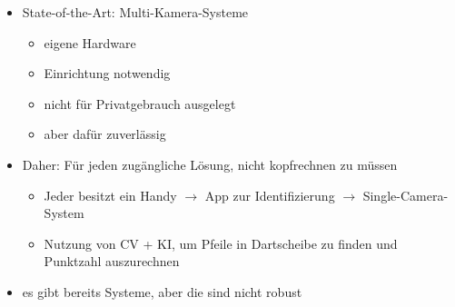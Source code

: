 \begin{itemize}
    \item State-of-the-Art: Multi-Kamera-Systeme
    \begin{itemize}
        \item eigene Hardware
        \item Einrichtung notwendig
        \item nicht für Privatgebrauch ausgelegt
        \item aber dafür zuverlässig
    \end{itemize}
    \item Daher: Für jeden zugängliche Lösung, nicht kopfrechnen zu müssen
    \begin{itemize}
        \item Jeder besitzt ein Handy $\rightarrow$ App zur Identifizierung $\rightarrow$ Single-Camera-System
        \item Nutzung von CV + KI, um Pfeile in Dartscheibe zu finden und Punktzahl auszurechnen
    \end{itemize}

    \item es gibt bereits Systeme, aber die sind nicht robust \cite{deepdarts, dartscore-repo}
\end{itemize}

\fi